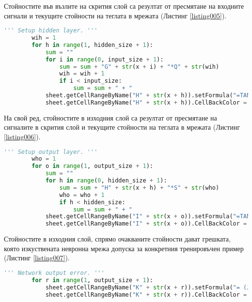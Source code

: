 Стойностите във възлите на скрития слой са резултат от пресмятане на входните сигнали и текущите стойности на теглата в мрежата (Листинг \ref{listing005}). 

\begin{lstlisting}[caption=Стойности на скрития слой при правия пас, language=Python, basicstyle=\tiny, label=listing005]
        ''' Setup hidden layer. '''
        wih = 1
        for h in range(1, hidden_size + 1):
            sum = ""
            for i in range(0, input_size + 1):
                sum = sum + "G" + str(x + i) + "*Q" + str(wih)
                wih = wih + 1
                if i < input_size:
                    sum = sum + " + "
            sheet.getCellRangeByName("H" + str(x + h)).setFormula("=TANH( " + sum + " )")
            sheet.getCellRangeByName("H" + str(x + h)).CellBackColor = (0 << 16 | 0 << 8 | 255)
\end{lstlisting}

На свой ред, стойностите в изходния слой са резултат от пресмятане на сигналите в скрития слой и текущите стойности на теглата в мрежата (Листинг \ref{listing006}).

\begin{lstlisting}[caption=Стойности на изходния слой при правия пас, language=Python, basicstyle=\tiny, label=listing006]
        ''' Setup output layer. '''
        who = 1
        for o in range(1, output_size + 1):
            sum = ""
            for h in range(0, hidden_size + 1):
                sum = sum + "H" + str(x + h) + "*S" + str(who)
                who = who + 1
                if h < hidden_size:
                    sum = sum + " + "
            sheet.getCellRangeByName("I" + str(x + o)).setFormula("=TANH( " + sum + " )")
            sheet.getCellRangeByName("I" + str(x + o)).CellBackColor = (0 << 16 | 255 << 8 | 0)
\end{lstlisting}

Стойностите в изходния слой, спрямо очакваните стойности дават грешката, която изкуствената невронна мрежа допуска за конкретния тренировъчен пример (Листинг \ref{listing007}).

\begin{lstlisting}[caption=Стойност на грешката допусната от мрежата за конкретния пример, language=Python, basicstyle=\tiny, label=listing007]
        ''' Network output error. '''
        for r in range(1, output_size + 1):
            sheet.getCellRangeByName("K" + str(x + r)).setFormula("= (J" + str(x + r) + "-I" + str(x + r) + ") * (J" + str(x + r) + "-I" + str(x + r) + ")")
            sheet.getCellRangeByName("K" + str(x + r)).CellBackColor = (0 << 16 | 255 << 8 | 255)
\end{lstlisting}

